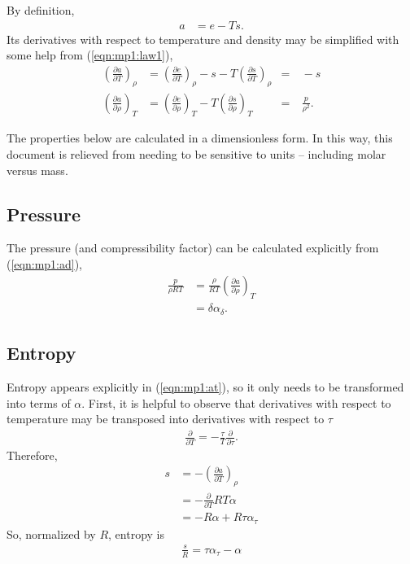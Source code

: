 By definition,
\begin{align}
a &= e - Ts \label{eqn:mp1:a}.
\end{align}
Its derivatives with respect to temperature and density may be simplified with some help from (\ref{eqn:mp1:law1}),
\begin{align}
\left(\frac{\partial a}{\partial T}\right)_\rho &= \left(\frac{\partial e}{\partial T}\right)_\rho - s - T \left(\frac{\partial s}{\partial T}\right)_\rho &=& \ -s\label{eqn:mp1:at}\\
\left(\frac{\partial a}{\partial \rho}\right)_T &= \left(\frac{\partial e}{\partial \rho}\right)_T - T \left(\frac{\partial s}{\partial \rho}\right)_T &=& \ \frac{p}{\rho^2} \label{eqn:mp1:ad}.
\end{align}

The properties below are calculated in a dimensionless form.  In this way, this document is relieved from needing to be sensitive to units -- including molar versus mass. 
 
\subsection{Pressure}\label{sec:mp1:p}

The pressure (and compressibility factor) can be calculated explicitly from (\ref{eqn:mp1:ad}),
\begin{align}
\frac{p}{\rho R T} &=  \frac{\rho}{R T}\left(\frac{\partial a}{\partial \rho}\right)_T\nonumber\\
&= \delta \alpha_\delta\label{eqn:mp1:p}.
\end{align}

\subsection{Entropy}\label{sec:mp1:s}

Entropy appears explicitly in (\ref{eqn:mp1:at}), so it only needs to be transformed into terms of $\alpha$.  First, it is helpful to observe that derivatives with respect to temperature may be transposed into derivatives with respect to $\tau$ 
\begin{align}
\frac{\partial}{\partial T} = -\frac{\tau}{T} \frac{\partial}{\partial \tau}.\nonumber
\end{align}
Therefore, 
\begin{align}
s &= -\left(\frac{\partial a}{\partial T}\right)_\rho \nonumber\\
&= -\frac{\partial}{\partial T} R T \alpha\nonumber\\
&= -R \alpha + R \tau \alpha_\tau
\end{align}
So, normalized by $R$, entropy is
\begin{align}
\frac{s}{R} = \tau \alpha_\tau - \alpha\label{eqn:mp1:s}
\end{align}

